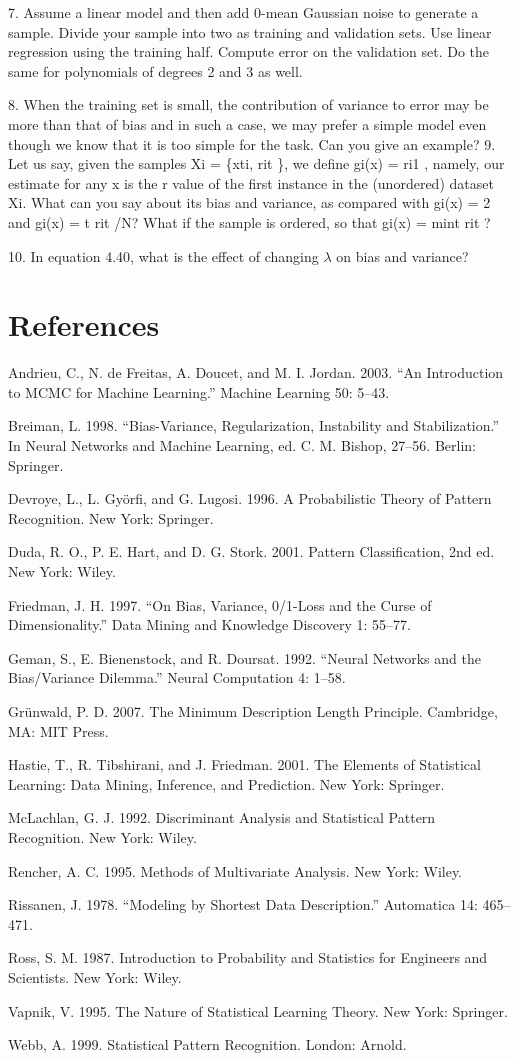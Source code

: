 7. Assume a linear model and then add 0-mean Gaussian noise to generate a sample. Divide your sample into two as training and validation sets. Use linear regression using the training half. Compute error on the validation set. Do the same for polynomials of degrees 2 and 3 as well.

8. When the training set is small, the contribution of variance to error may be more than that of bias and in such a case, we may prefer a simple model even though we know that it is too simple for the task. Can you give an example? 9. Let us say, given the samples Xi = \{xti, rit \}, we define gi(x) = ri1 , namely, our estimate for any x is the r value of the first instance in the (unordered) dataset Xi. What can you say about its bias and variance, as compared with gi(x) = 2 and gi(x) = t rit /N? What if the sample is ordered, so that gi(x) = mint rit ?

10. In equation 4.40, what is the effect of changing $\lambda$ on bias and variance?

\section{References}

Andrieu, C., N. de Freitas, A. Doucet, and M. I. Jordan. 2003. “An Introduction to MCMC for Machine Learning.” Machine Learning 50: 5--43.

Breiman, L. 1998. “Bias-Variance, Regularization, Instability and Stabilization.” In Neural Networks and Machine Learning, ed. C. M. Bishop, 27--56. Berlin: Springer.

Devroye, L., L. Györfi, and G. Lugosi. 1996. A Probabilistic Theory of Pattern Recognition. New York: Springer.

Duda, R. O., P. E. Hart, and D. G. Stork. 2001. Pattern Classification, 2nd ed. New York: Wiley.

Friedman, J. H. 1997. “On Bias, Variance, 0/1-Loss and the Curse of Dimensionality.” Data Mining and Knowledge Discovery 1: 55--77.

Geman, S., E. Bienenstock, and R. Doursat. 1992. “Neural Networks and the Bias/Variance Dilemma.” Neural Computation 4: 1--58.

Grünwald, P. D. 2007. The Minimum Description Length Principle. Cambridge, MA: MIT Press.

Hastie, T., R. Tibshirani, and J. Friedman. 2001. The Elements of Statistical Learning: Data Mining, Inference, and Prediction. New York: Springer.

McLachlan, G. J. 1992. Discriminant Analysis and Statistical Pattern Recognition. New York: Wiley.

Rencher, A. C. 1995. Methods of Multivariate Analysis. New York: Wiley.

Rissanen, J. 1978. “Modeling by Shortest Data Description.” Automatica 14: 465--471.

Ross, S. M. 1987. Introduction to Probability and Statistics for Engineers and Scientists. New York: Wiley.

Vapnik, V. 1995. The Nature of Statistical Learning Theory. New York: Springer.

Webb, A. 1999. Statistical Pattern Recognition. London: Arnold.
